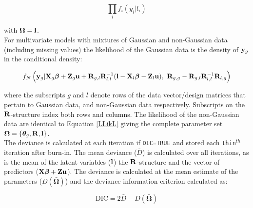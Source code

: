 \documentclass{article}
\begin{document}
\begin{equation}
\prod_{i}f_{i}(y_{i} | l_{i})
\label{LLikL}
\end{equation}

with ${\bm \Omega} = {\bf l}$.\\

For multivariate models with mixtures of Gaussian and non-Gaussian data (including missing values) the likelihood of the Gaussian data is the density of ${\bf y}_{g}$ in the conditional density:

\begin{equation}
f_{N}\left({\bf y}_{g} | {\bf X}_{g}{\bm \beta}+{\bf Z}_{g}{\bf u}+{\bf R}_{g,l}{\bf R}^{-1}_{l,l}({\bf l}-{\bf X}_{l}{\bm \beta}-{\bf Z}_{l}{\bf u}),\ {\bf R}_{g,g}-{\bf R}_{g,l}{\bf R}^{-1}_{l,l}{\bf R}_{l,g}\right) 
\end{equation}

where the subscripts $g$ and $l$ denote rows of the data vector/design matrices that pertain to Gaussian data, and non-Gaussian data respectively. Subscripts on the ${\bf R}$-structure index both rows and columns. The likelihood of the non-Gaussian data are identical to Equation \ref{LLikL} giving the complete parameter set ${\bm \Omega} = \left\{{\bm \theta}_{g}, {\bf R}, {\bf l} \right\}$.\\

The deviance is calculated at each iteration if \texttt{DIC=TRUE} and stored each \texttt{thin}$^{th}$ iteration after burn-in.  The mean deviance ($\bar{D}$) is calculated over all iterations, as is the mean of the latent variables (${\bf l}$) the ${\bf R}$-structure and the vector of predictors (${\bf X}{\bm \beta}+{\bf Z}{\bf u}$).  The deviance is calculated at the mean estimate of the parameters ($D(\bar{\bm \Omega})$) and the deviance information criterion calculated as:

\begin{equation}
\textrm{DIC} = 2\bar{D}-D(\bar{\bm \Omega})
\end{equation}

\ifalone


\end{document}
